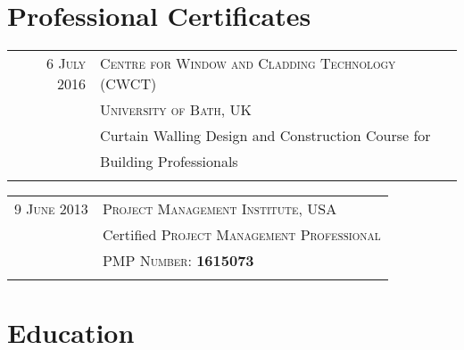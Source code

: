 \documentclass[a4paper,11pt]{article} %
\begin{document}

\section{Professional Certificates}

\begin{tabular}{r|l}
\hspace{9.5mm}\textsc{6 July} 2016 & \textsc{Centre for Window and Cladding Technology (CWCT)}\\
& \textsc{University of Bath, UK}\\
& Curtain Walling Design and Construction Course for \\
& Building Professionals \\
\multicolumn{2}{c}{} \\
\end{tabular}

\begin{tabular}{r|l}
\hspace{9.5mm}\textsc{9 June} 2013 & \textsc{Project Management Institute}, USA\\
& Certified \textsc{Project Management Professional}\\
& \textsc{PMP Number:} \textbf{1615073}\\
\multicolumn{2}{c}{} \\
\end{tabular}


\section{Education}
\end{document}

